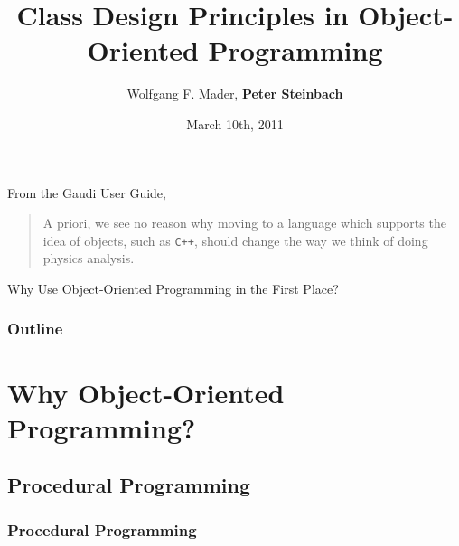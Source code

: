 \documentclass[9pt,dvips]{beamer}
\begin{document}

\title[Class Design Principles]{ Class Design Principles in Object-Oriented Programming }
\author[P. Steinbach]{Wolfgang F. Mader, \textbf{Peter Steinbach}}
\date{March 10th, 2011}




\begin{frame}
  \vfill
  \begin{center}
    \begin{block}{From the Gaudi User Guide, \cite{gug}}
      \begin{quotation}
        A priori, we see no reason why moving to a language which supports the idea of objects, such as \texttt{C++}, should change the way we think of doing physics analysis.
      \end{quotation}
    \end{block}
    \huge
    Why Use Object-Oriented Programming in the First Place?
  \end{center}

  \vfill
\end{frame}

\maketitle

\begin{frame}
\frametitle{Outline}
\tableofcontents
\end{frame}

\section[Why OOP?]{Why Object-Oriented Programming?}
\subsection[Procedural]{Procedural Programming}
\begin{frame}
\frametitle{Procedural Programming}

\end{frame}
\end{document}
